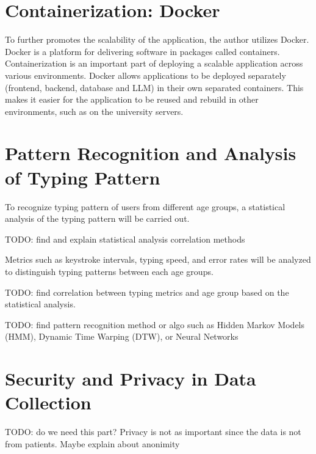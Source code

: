 \section{Containerization: Docker}
To further promotes the scalability of the application, the author utilizes Docker.
Docker is a platform for delivering software in packages called containers.
Containerization is an important part of deploying a scalable application across various environments.
Docker allows applications to be deployed separately (frontend, backend, database and \ac{LLM}) in their own separated containers.
This makes it easier for the application to be reused and rebuild in other environments, such as on the university servers.

\section{Pattern Recognition and Analysis of Typing Pattern}
To recognize typing pattern of users from different age groups, a statistical analysis of the typing pattern will be carried out.

TODO: find and explain statistical analysis correlation methods

Metrics such as keystroke intervals, typing speed, and error rates will be analyzed to distinguish typing patterns between each age groups. 

TODO: find correlation between typing metrics and age group based on the statistical analysis.

TODO: find pattern recognition method or algo such as Hidden Markov Models (HMM), Dynamic Time Warping (DTW), or Neural Networks 

\section{Security and Privacy in Data Collection}
TODO: do we need this part? Privacy is not as important since the data is not from patients. Maybe explain about anonimity
